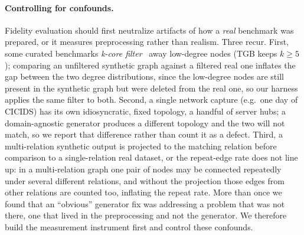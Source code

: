 \documentclass[sigconf,review,anonymous]{acmart}
\begin{document}
\paragraph{Controlling for confounds.}
Fidelity evaluation should first neutralize artifacts of how a \emph{real} benchmark
was prepared, or it measures preprocessing rather than realism. Three recur. First,
some curated benchmarks \emph{k-core filter}~\cite{seidman1983kcore} away low-degree
nodes (TGB keeps $k\!\ge\!5$); comparing an unfiltered synthetic graph against a
filtered real one inflates the gap between the two degree distributions, since the
low-degree nodes are still present in the synthetic graph but were deleted from the real
one, so our harness applies the same filter to both. Second, a single network capture
(e.g.\ one day of CICIDS) has its own idiosyncratic, fixed topology, a handful of server
hubs; a domain-agnostic generator produces a different topology and the two will not
match, so we report that difference rather than count it as a defect. Third, a
multi-relation synthetic output is projected to the matching relation before comparison
to a single-relation real dataset, or the repeat-edge rate does not line up: in a
multi-relation graph one pair of nodes may be connected repeatedly under several
different relations, and without the projection those edges from other relations are
counted too, inflating the repeat rate. More than once we found that an ``obvious''
generator fix was addressing a problem that was not there, one that lived in the
preprocessing and not the generator. We therefore build the measurement instrument
first and control these confounds.
\end{document}
